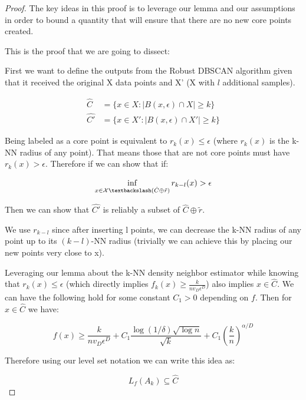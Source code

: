 \begin{proof}
The key ideas in this proof is to leverage our lemma and our assumptions in order to bound a quantity that will ensure that there are no new core points created.

This is the proof that we are going to dissect:

First we want to define the outputs from the Robust DBSCAN algorithm given that it received the original X data points and X' (X with $l$ additional samples).

\begin{align*}
\hat{C} &= \{x \in X: |B(x,\epsilon) \cap X|\geq k \}\\
\hat{C'} &= \{x \in X': |B(x,\epsilon) \cap X'|\geq k \}
\end{align*}

Being labeled as a core point is equivalent to $r_k(x) \leq\epsilon$ (where $r_k(x)$ is the k-NN radius of any point). That means those that are not core points must have $r_k(x) > \epsilon$. Therefore if we can show that if:

\begin{equation*}
    \inf\limits_{x\in\mathcal{X} \textbackslash (\hat{C}\oplus\tilde{r})} r_{k-l}(x)>\epsilon
\end{equation*}

Then we can show that $\hat{C'}$ is reliably a subset of $\hat{C}\oplus\tilde{r}$. 

We use $r_{k-l}$ since after inserting l points, we can decrease the k-NN radius of any point up to its $(k-l)$-NN radius (trivially we can achieve this by placing our new points very close to x).

Leveraging our lemma about the k-NN density neighbor estimator while knowing that $r_k(x)\leq \epsilon$ (which directly implies $f_k(x) \geq \frac{k}{nv_D\epsilon^D}$) also implies $x\in\hat{C}$. We can have the following hold for some constant $C_1>0$ depending on $f$. Then for $x \in \hat{C}$ we have:

\begin{equation*}
    f(x) \geq \frac{k}{nv_D\epsilon^D} +  C_1 \frac{\log(1/\delta)\sqrt{\log n}}{\sqrt{k}} + C_1\left(\frac{k}{n}\right)^{\alpha/D}
\end{equation*}

Therefore using our level set notation we can write this idea as:

\begin{equation*}
    L_{f}(A_k) \subseteq \hat{C}
\end{equation*}


\end{proof}
